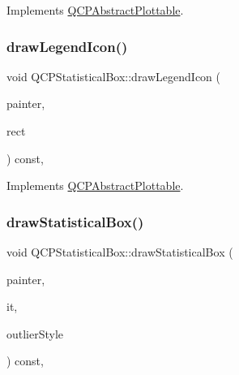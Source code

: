 Implements \hyperlink{class_q_c_p_abstract_plottable_a453f676a5cee7bf846c5f0fa05ea84b3}{Q\+C\+P\+Abstract\+Plottable}.

\mbox{\label{class_q_c_p_statistical_box_ad286c63a79c21d5231a4b6c6fdbb914f}} 
\subsubsection{\texorpdfstring{draw\+Legend\+Icon()}{drawLegendIcon()}}
{\footnotesize\ttfamily void Q\+C\+P\+Statistical\+Box\+::draw\+Legend\+Icon (\begin{DoxyParamCaption}\item[{\hyperlink{class_q_c_p_painter}{Q\+C\+P\+Painter} $\ast$}]{painter,  }\item[{const Q\+RectF \&}]{rect }\end{DoxyParamCaption}) const\hspace{0.3cm}{\ttfamily [protected]}, {\ttfamily [virtual]}}



Implements \hyperlink{class_q_c_p_abstract_plottable_a9a450783fd9ed539e589999fd390cdf7}{Q\+C\+P\+Abstract\+Plottable}.

\mbox{\label{class_q_c_p_statistical_box_a02dc6b561be8203d460d7263da74b8a9}} 
\subsubsection{\texorpdfstring{draw\+Statistical\+Box()}{drawStatisticalBox()}}
{\footnotesize\ttfamily void Q\+C\+P\+Statistical\+Box\+::draw\+Statistical\+Box (\begin{DoxyParamCaption}\item[{\hyperlink{class_q_c_p_painter}{Q\+C\+P\+Painter} $\ast$}]{painter,  }\item[{\hyperlink{class_q_c_p_data_container_ae40a91f5cb0bcac61d727427449b7d15}{Q\+C\+P\+Statistical\+Box\+Data\+Container\+::const\+\_\+iterator}}]{it,  }\item[{const \hyperlink{class_q_c_p_scatter_style}{Q\+C\+P\+Scatter\+Style} \&}]{outlier\+Style }\end{DoxyParamCaption}) const\hspace{0.3cm}{\ttfamily [protected]}, {\ttfamily [virtual]}}

